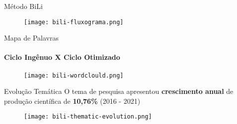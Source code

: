 \begin{frame}[c]{Método BiLi}
    \begin{figure}
        \centering
        \texttt{[image: bili-fluxograma.png]}
    \end{figure}
\end{frame}

\begin{frame}[c]{Mapa de Palavras}
    \framesubtitle{Ciclo Ingênuo X Ciclo Otimizado}
    \begin{figure}
        \centering
        \texttt{[image: bili-wordclould.png]}
    \end{figure}
\end{frame}

\begin{frame}[c]{Evolução Temática}
    O tema de pesquisa apresentou \textbf{crescimento anual} de produção científica de \textbf{10,76\%} (2016 - 2021)\\
    \begin{figure}
        \centering
        \texttt{[image: bili-thematic-evolution.png]}
    \end{figure}
\end{frame}

